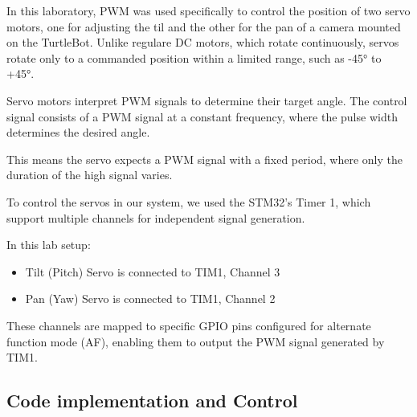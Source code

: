 
In this laboratory, PWM was used specifically to control the position of two servo motors, one for adjusting the til and the other for the pan of a camera mounted on the TurtleBot. Unlike regulare DC motors, which rotate continuously, servos rotate only to a commanded position within a limited range, such as -45° to +45°.

Servo motors interpret PWM signals to determine their target angle. The control signal consists of a PWM signal at a constant frequency, where the pulse width determines the desired angle.

This means the servo expects a PWM signal with a fixed period, where only the duration of the high signal varies. 

To control the servos in our system, we used 
the STM32's Timer 1, which support multiple channels for independent signal generation. 

In this lab setup:

\begin{itemize}
    \item Tilt (Pitch) Servo is connected to TIM1, Channel 3
    \item Pan (Yaw) Servo is connected to TIM1, Channel 2
\end{itemize}

These channels are mapped to specific GPIO pins configured for alternate function mode (AF), enabling them to output the PWM signal generated by TIM1. 







\subsection{Code implementation and Control}

